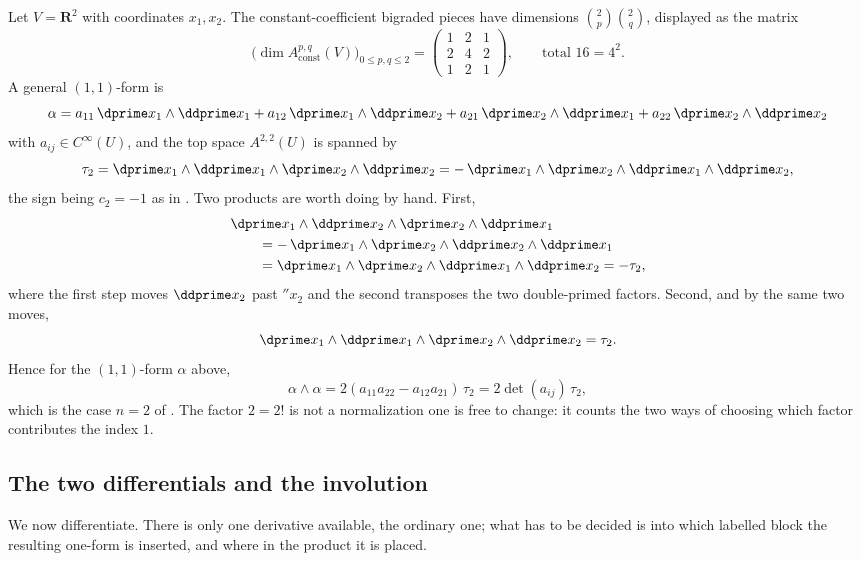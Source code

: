 \begin{example}
\label{ex:ch09-plane}
Let $V=\mathbf R^2$ with coordinates $x_1,x_2$.  The constant-coefficient
bigraded pieces have dimensions $\binom2p\binom2q$, displayed as the matrix
\[
 \bigl(\dim A_{\mathrm{const}}^{p,q}(V)\bigr)_{0\le p,q\le2}
 =\begin{pmatrix}1&2&1\\2&4&2\\1&2&1\end{pmatrix},
 \qquad\text{total }16=4^2 .
\]
A general $(1,1)$-form is
\[
 \alpha=a_{11}\,\dprime x_1\wedge\ddprime x_1
       +a_{12}\,\dprime x_1\wedge\ddprime x_2
       +a_{21}\,\dprime x_2\wedge\ddprime x_1
       +a_{22}\,\dprime x_2\wedge\ddprime x_2
\]
with $a_{ij}\in C^\infty(U)$, and the top space $A^{2,2}(U)$ is spanned by
\[
 \tau_2=\dprime x_1\wedge\ddprime x_1\wedge\dprime x_2\wedge\ddprime x_2
      =-\,\dprime x_1\wedge\dprime x_2\wedge\ddprime x_1\wedge\ddprime x_2,
\]
the sign being $c_2=-1$ as in .  Two products are
worth doing by hand.  First,
\[
 \begin{aligned}
  &\dprime x_1\wedge\ddprime x_2\wedge\dprime x_2\wedge\ddprime x_1\\
  &\qquad=-\,\dprime x_1\wedge\dprime x_2
             \wedge\ddprime x_2\wedge\ddprime x_1\\
  &\qquad=\dprime x_1\wedge\dprime x_2
             \wedge\ddprime x_1\wedge\ddprime x_2
   =-\tau_2 ,
 \end{aligned}
\]
where the first step moves $\ddprime x_2$ past $\dprime x_2$ and the second
transposes the two double-primed factors.  Second, and by the same two moves,
\[
 \dprime x_1\wedge\ddprime x_1\wedge\dprime x_2\wedge\ddprime x_2=\tau_2 .
\]
Hence for the $(1,1)$-form $\alpha$ above,
\[
 \alpha\wedge\alpha=2(a_{11}a_{22}-a_{12}a_{21})\,\tau_2
 =2\det(a_{ij})\,\tau_2 ,
\]
which is the case $n=2$ of .  The factor
$2=2!$ is not a normalization one is free to change: it counts the two ways
of choosing which factor contributes the index $1$.
\end{example}

\subsection{The two differentials and the involution}

We now differentiate.  There is only one derivative available, the ordinary
one; what has to be decided is into which labelled block the resulting
one-form is inserted, and where in the product it is placed.

